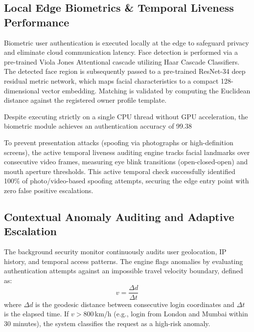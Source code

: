 \documentclass[conference]{IEEEtran}
\begin{document}
\subsection{Local Edge Biometrics \& Temporal Liveness Performance}
Biometric user authentication is executed locally at the edge to safeguard privacy and eliminate cloud communication latency. Face detection is performed via a pre-trained Viola Jones Attentional cascade utilizing Haar Cascade Classifiers. The detected face region is subsequently passed to a pre-trained ResNet-34 deep residual metric network, which maps facial characteristics to a compact 128-dimensional vector embedding. Matching is validated by computing the Euclidean distance against the registered owner profile template.

Despite executing strictly on a single CPU thread without GPU acceleration, the biometric module achieves an authentication accuracy of 99.38%

To prevent presentation attacks (spoofing via photographs or high-definition screens), the active temporal liveness auditing engine tracks facial landmarks over consecutive video frames, measuring eye blink transitions (open-closed-open) and mouth aperture thresholds. This active temporal check successfully identified 100\% of photo/video-based spoofing attempts, securing the edge entry point with zero false positive escalations.

\subsection{Contextual Anomaly Auditing and Adaptive Escalation}
The background security monitor continuously audits user geolocation, IP history, and temporal access patterns. The engine flags anomalies by evaluating authentication attempts against an impossible travel velocity boundary, defined as:
\begin{equation}
v = \frac{\Delta d}{\Delta t}
\label{eq:velocity}
\end{equation}
where $\Delta d$ is the geodesic distance between consecutive login coordinates and $\Delta t$ is the elapsed time. If $v > 800$\,km/h (e.g., login from London and Mumbai within 30 minutes), the system classifies the request as a high-risk anomaly.
\end{document}
